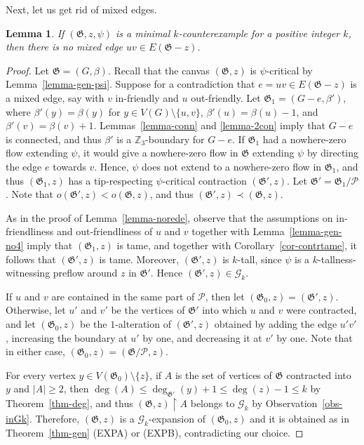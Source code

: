 \documentclass{article}
\newcommand{\Z}{\mathbb{Z}_3}
\newcommand{\PP}{\mathcal{P}}
\newcommand{\GG}{\mathcal{G}}
\newcommand\g{\mathfrak{G}}
\newtheorem{lemma}[theorem]{Lemma}
\begin{document}
Next, let us get rid of mixed edges.

\begin{lemma}\label{lemma-gen-norede2}
If $(\g,z,\psi)$ is a minimal $k$-counterexample for a positive integer $k$, then
there is no mixed edge $uv\in E(\g-z)$.
\end{lemma}
\begin{proof}
Let $\g=(G,\beta)$.  Recall that the canvas $(\g,z)$ is $\psi$-critical by Lemma~\ref{lemma-gen-psi}.
Suppose for a contradiction that $e=uv\in E(\g-z)$ is a mixed edge, say with $v$ in-friendly and
$u$ out-friendly.  Let $\g_1=(G-e,\beta')$, where $\beta'(y)=\beta(y)$ for $y\in V(G)\setminus\{u,v\}$, $\beta'(u)=\beta(u)-1$, and $\beta'(v)=\beta(v)+1$.
Lemmas~\ref{lemma-conn} and \ref{lemma-2con} imply that $G-e$ is connected, and thus $\beta'$ is a $\Z$-boundary for $G-e$.
If $\g_1$ had a nowhere-zero flow extending $\psi$, it would give a nowhere-zero flow in $\g$ extending $\psi$
by directing the edge $e$ towards $v$.  Hence, $\psi$ does not extend to a nowhere-zero flow in $\g_1$, and thus $(\g_1,z)$ has a tip-respecting
$\psi$-critical contraction $(\g',z)$. Let $\g'=\g_1/\PP$.  Note that $o(\g',z)<o(\g,z)$, and thus $(\g',z)\prec (\g,z)$.

As in the proof of Lemma~\ref{lemma-norede}, observe that the assumptions on in-friendliness and out-friendliness of $u$ and $v$
together with Lemma~\ref{lemma-gen-no4} imply that $(\g_1,z)$ is tame, and together with Corollary~\ref{cor-contrtame},
it follows that $(\g',z)$ is tame.  Moreover, $(\g',z)$ is $k$-tall, since $\psi$ is a $k$-tallness-witnessing preflow around $z$ in $\g'$.
Hence $(\g',z)\in\GG_k$.

If $u$ and $v$ are contained in the same part of $\PP$, then let $(\g_0,z)=(\g',z)$.  Otherwise, let $u'$ and $v'$ be the vertices of $\g'$
into which $u$ and $v$ were contracted, and let $(\g_0,z)$ be the $1$-alteration of $(\g',z)$ obtained by adding the edge $u'v'$,
increasing the boundary at $u'$ by one, and decreasing it at $v'$ by one.  Note that in either case, $(\g_0,z)=(\g / \PP,z)$.

For every vertex $y\in V(\g_0)\setminus\{z\}$, if $A$ is the set of vertices of $\g$ contracted into $y$ and $|A|\ge 2$,
then $\deg(A)\le \deg_{\g'}(y)+1\le \deg(z)-1\le k$ by Theorem~\ref{thm-deg}, and thus $(\g,z)\restriction A$
belongs to $\GG_k$ by Observation~\ref{obs-inGk}.
Therefore, $(\g,z)$ is a $\GG_k$-expansion of $(\g_0,z)$ and it is obtained as in Theorem~\ref{thm-gen} (EXPA) or (EXPB), contradicting our choice. 
\end{proof}
\end{document}
